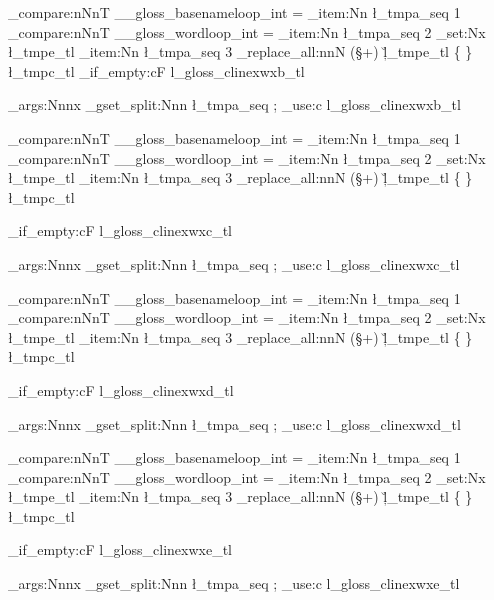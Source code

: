 {{		\int_compare:nNnT
								  { \g__gloss_basenameloop_int } = { \seq_item:Nn \l_tmpa_seq { 1 } } %
								  {
		\int_compare:nNnT
								  { \g__gloss_wordloop_int } = { \seq_item:Nn \l_tmpa_seq { 2 } } %
								  {
\tl_set:Nx \l_tmpe_tl { \seq_item:Nn \l_tmpa_seq { 3 } } %
		\regex_replace_all:nnN
				{ (\S+) }
				{ \c{\u{l_tmpe_tl}} \cB\{ \0 \cE\} }
				\l_tmpc_tl
												}}%
			}%
		\tl_if_empty:cF { l_gloss_clinexwxb_tl }
		{  
			\exp_args:Nnnx
	\seq_gset_split:Nnn 
		\l_tmpa_seq
			{ ; } %
			{ \tl_use:c { l_gloss_clinexwxb_tl } }
			
		\int_compare:nNnT
								  { \g__gloss_basenameloop_int } = { \seq_item:Nn \l_tmpa_seq { 1 } } %
								  {
		\int_compare:nNnT
								  { \g__gloss_wordloop_int } = { \seq_item:Nn \l_tmpa_seq { 2 } } %
								  {
\tl_set:Nx \l_tmpe_tl { \seq_item:Nn \l_tmpa_seq { 3 } } %
		\regex_replace_all:nnN
				{ (\S+) }
				{ \c{\u{l_tmpe_tl}} \cB\{ \0 \cE\} }
				\l_tmpc_tl
												}}%
			}%
		\tl_if_empty:cF { l_gloss_clinexwxc_tl }
		{  
			\exp_args:Nnnx
	\seq_gset_split:Nnn 
		\l_tmpa_seq
			{ ; } %
			{ \tl_use:c { l_gloss_clinexwxc_tl } }
			
		\int_compare:nNnT
								  { \g__gloss_basenameloop_int } = { \seq_item:Nn \l_tmpa_seq { 1 } } %
								  {
		\int_compare:nNnT
								  { \g__gloss_wordloop_int } = { \seq_item:Nn \l_tmpa_seq { 2 } } %
								  {
\tl_set:Nx \l_tmpe_tl { \seq_item:Nn \l_tmpa_seq { 3 } } %
		\regex_replace_all:nnN
				{ (\S+) }
				{ \c{\u{l_tmpe_tl}} \cB\{ \0 \cE\} }
				\l_tmpc_tl
												}}%
			}%
		\tl_if_empty:cF { l_gloss_clinexwxd_tl }
		{  
			\exp_args:Nnnx
	\seq_gset_split:Nnn 
		\l_tmpa_seq
			{ ; } %
			{ \tl_use:c { l_gloss_clinexwxd_tl } }
			
		\int_compare:nNnT
								  { \g__gloss_basenameloop_int } = { \seq_item:Nn \l_tmpa_seq { 1 } } %
								  {
		\int_compare:nNnT
								  { \g__gloss_wordloop_int } = { \seq_item:Nn \l_tmpa_seq { 2 } } %
								  {
\tl_set:Nx \l_tmpe_tl { \seq_item:Nn \l_tmpa_seq { 3 } } %
		\regex_replace_all:nnN
				{ (\S+) }
				{ \c{\u{l_tmpe_tl}} \cB\{ \0 \cE\} }
				\l_tmpc_tl
												}}%
			}%
		\tl_if_empty:cF { l_gloss_clinexwxe_tl }
		{  
			\exp_args:Nnnx
	\seq_gset_split:Nnn 
		\l_tmpa_seq
			{ ; } %
			{ \tl_use:c { l_gloss_clinexwxe_tl } }
			
}}
